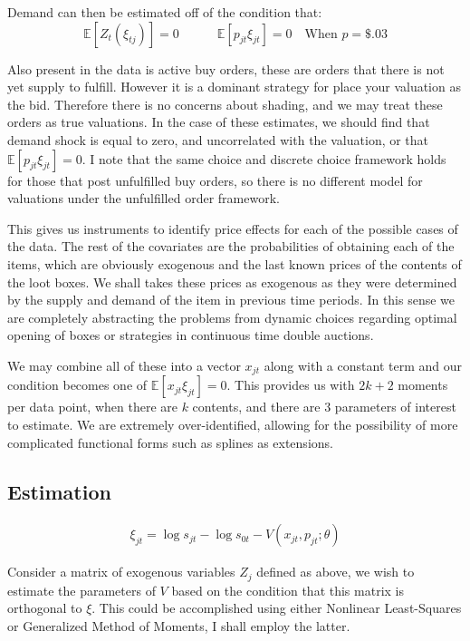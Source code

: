 \documentclass[12pt]{paper}
\newcommand{\exV}[1]{\mathbb{E} \left [ #1 \right ]}
\begin{document}
Demand can then be estimated off of the condition that:
\begin{equation*}
  \exV{Z_t (\xi_{tj})} = 0 \quad \quad \quad \exV{ p_{jt} \xi_{jt} } = 0 \quad \text{When } p = \$.03
\end{equation*}

Also present in the data is active buy orders, these are orders
that there is not yet supply to fulfill. However it is a dominant
strategy for place your valuation as the bid. Therefore there is no
concerns about shading, and we may treat these orders as true
valuations. In the case of these estimates, we should find that demand
shock is equal to zero, and uncorrelated with the valuation, or that
$\exV{p_{jt}\xi_{jt}} = 0$. I note that the same choice and discrete
choice framework holds for those that post unfulfilled buy orders, so
there is no different model for valuations under the unfulfilled order
framework. 

This gives us instruments to identify price effects for each of the
possible cases of the data. The rest of the covariates are the
probabilities of obtaining each of the items, which are obviously
exogenous and the last known prices of the contents of the loot
boxes. We shall takes these prices as exogenous as they were
determined by the supply and demand of the item in previous time
periods. In this sense we are completely abstracting the problems from
dynamic choices regarding optimal opening of boxes or strategies in
continuous time double auctions. 

We may combine all of these into a vector $x_{jt}$ along with a
constant term and our condition becomes one of
$\exV{x_{jt}\xi_{jt}} = 0$. This provides us with $2k + 2$ moments per
data point, when there are $k$ contents, and there are $3$
parameters of interest to estimate. We are extremely over-identified,
allowing for the possibility of more complicated functional forms such
as splines as extensions. 

\subsection{Estimation}

\begin{align*}
  \xi_{jt} = \log s_{jt} - \log s_{0t} - V( x_{jt}, p_{jt}; \theta)
\end{align*}


Consider a matrix of exogenous variables $Z_j$ defined as above, we wish
to estimate the parameters of $V$ based on the condition that this
matrix is orthogonal to $\xi$. This could be accomplished using either
Nonlinear Least-Squares or Generalized Method of Moments, I shall
employ the latter.
\end{document}
